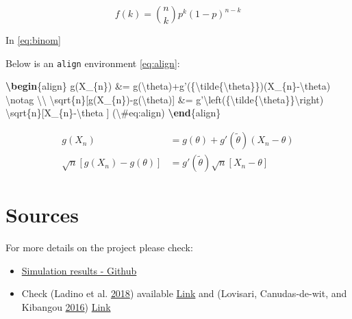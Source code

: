\documentclass[]{book}
\newenvironment{Shaded}{\begin{snugshade}}{\end{snugshade}}
\newcommand{\ExtensionTok}[1]{#1}
\newcommand{\KeywordTok}[1]{\textcolor[rgb]{0.13,0.29,0.53}{\textbf{#1}}}
\newcommand{\NormalTok}[1]{#1}
\newcommand{\SpecialCharTok}[1]{\textcolor[rgb]{0.00,0.00,0.00}{#1}}
\newcommand{\SpecialStringTok}[1]{\textcolor[rgb]{0.31,0.60,0.02}{#1}}
\theoremstyle{definition}
\theoremstyle{definition}
\theoremstyle{definition}
\theoremstyle{remark}
\begin{document}
\begin{equation}
f\left(k\right)=\binom{n}{k}p^k\left(1-p\right)^{n-k} \label{eq:binom}
\end{equation}

In \eqref{eq:binom}

Below is an \texttt{align} environment \eqref{eq:align}:

\begin{Shaded}
\begin{Highlighting}[]
\KeywordTok{\textbackslash{}begin}\NormalTok{\{}\ExtensionTok{align}\NormalTok{\}}\SpecialStringTok{ }
\SpecialStringTok{g(X_\{n\}) &= g(}\SpecialCharTok{\textbackslash{}theta}\SpecialStringTok{)+g'(\{}\SpecialCharTok{\textbackslash{}tilde}\SpecialStringTok{\{}\SpecialCharTok{\textbackslash{}theta}\SpecialStringTok{\}\})(X_\{n\}-}\SpecialCharTok{\textbackslash{}theta}\SpecialStringTok{) }\SpecialCharTok{\textbackslash{}notag}\SpecialStringTok{ }\SpecialCharTok{\textbackslash{}\textbackslash{}}
\SpecialCharTok{\textbackslash{}sqrt}\SpecialStringTok{\{n\}[g(X_\{n\})-g(}\SpecialCharTok{\textbackslash{}theta}\SpecialStringTok{)] &= g'}\SpecialCharTok{\textbackslash{}left}\SpecialStringTok{(\{}\SpecialCharTok{\textbackslash{}tilde}\SpecialStringTok{\{}\SpecialCharTok{\textbackslash{}theta}\SpecialStringTok{\}\}}\SpecialCharTok{\textbackslash{}right}\SpecialStringTok{)}
\SpecialStringTok{  }\SpecialCharTok{\textbackslash{}sqrt}\SpecialStringTok{\{n\}[X_\{n\}-}\SpecialCharTok{\textbackslash{}theta}\SpecialStringTok{ ] (}\SpecialCharTok{\textbackslash{}#}\SpecialStringTok{eq:align)}
\KeywordTok{\textbackslash{}end}\NormalTok{\{}\ExtensionTok{align}\NormalTok{\} }
\end{Highlighting}
\end{Shaded}

\begin{align}
g(X_{n}) &= g(\theta)+g'({\tilde{\theta}})(X_{n}-\theta)\\
\sqrt{n}[g(X_{n})-g(\theta)] &= g'\left({\tilde{\theta}}\right)
  \sqrt{n}[X_{n}-\theta ] \label{eq:align}
\end{align}

\hypertarget{sources-2}{%
\section*{Sources}\label{sources-2}}

For more details on the project please check:

\begin{itemize}
\item
  \href{https://github.com/aladinoster/density-reconstruction}{Simulation
  results - Github}
\item
  Check (Ladino et al. \protect\hyperlink{ref-Ladino2018}{2018})
  available \href{https://hal.archives-ouvertes.fr/hal-01731356}{Link}
  and (Lovisari, Canudas-de-wit, and Kibangou
  \protect\hyperlink{ref-Lovisari2016}{2016})
  \href{https://hal.archives-ouvertes.fr/hal-01375928}{Link}
\end{itemize}
\end{document}
